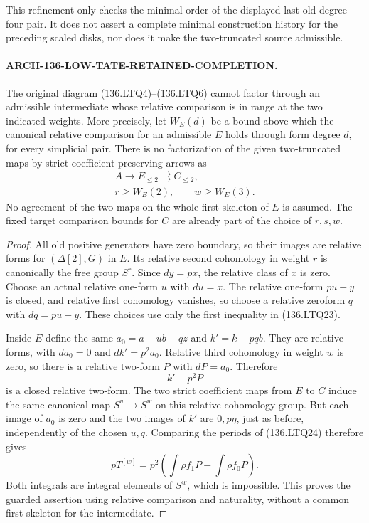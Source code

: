 This refinement only checks the minimal order of the displayed
last old degree-four pair.  It does not assert a complete
minimal construction history for the preceding scaled disks,
nor does it make the two-truncated source admissible.

\paragraph{ARCH-136-LOW-TATE-RETAINED-COMPLETION.}
The original diagram (136.LTQ4)--(136.LTQ6) cannot factor
through an admissible intermediate whose relative comparison
is in range at the two indicated weights.  More precisely,
let \(W_E(d)\) be a bound above which the canonical
relative comparison for an admissible \(E\) holds through
form degree \(d\), for every simplicial pair.  There is
no factorization of the given two-truncated maps by strict
coefficient-preserving arrows as
\[
 \begin{gathered}
 A\longrightarrow E_{\leq2}\rightrightarrows C_{\leq2},\\
 r\geq W_E(2),\qquad w\geq W_E(3).
 \end{gathered}
                                                        \tag{136.LTQ23}
\]
No agreement of the two maps on the whole first skeleton of
\(E\) is assumed.  The fixed target comparison bounds
for \(C\) are already part of the choice of \(r,s,w\).

\begin{proof}
All old positive generators have zero boundary, so their images
are relative forms for \((\Delta[2],G)\) in \(E\).
Its relative second cohomology in weight \(r\) is
canonically the free group \(S^r\).  Since \(dy=px\),
the relative class of \(x\) is zero.  Choose an actual
relative one-form \(u\) with \(du=x\).  The relative
one-form \(pu-y\) is closed, and relative first cohomology
vanishes, so choose a relative zeroform \(q\) with
\(dq=pu-y\).  These choices use only the first inequality
in (136.LTQ23).

Inside \(E\) define the same \(a_0=a-ub-qz\) and
\(k'=k-pqb\).  They are relative forms, with
\(da_0=0\) and \(dk'=p^2a_0\).  Relative third
cohomology in weight \(w\) is zero, so there is a relative
two-form \(P\) with \(dP=a_0\).  Therefore
\[
                             k'-p^2P
                                                        \tag{136.LTQ24}
\]
is a closed relative two-form.  The two strict coefficient maps
from \(E\) to \(C\) induce the same canonical map
\(S^w\to S^w\) on this relative cohomology group.
But each image of \(a_0\) is zero and the two images
of \(k'\) are \(0,p\eta\), just as before, independently
of the chosen \(u,q\).  Comparing the periods of
(136.LTQ24) therefore gives
\[
 pT^{[w]}=p^2\left(
       \int\rho f_1P-\int\rho f_0P\right).
                                                        \tag{136.LTQ25}
\]
Both integrals are integral elements of \(S^w\), which
is impossible.  This proves the guarded assertion using
relative comparison and naturality, without a common first
skeleton for the intermediate.
\end{proof}

